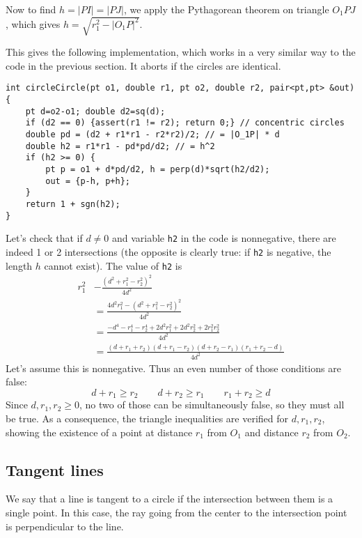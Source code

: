 Now to find $h=|PI|=|PJ|$, we apply the Pythagorean theorem on triangle $O_1PJ$, which gives $h=\sqrt{r_1^2 - |O_1P|^2}$.

This gives the following implementation, which works in a very similar way to the code in the previous section. It aborts if the circles are identical.
\begin{lstlisting}
int circleCircle(pt o1, double r1, pt o2, double r2, pair<pt,pt> &out) {
    pt d=o2-o1; double d2=sq(d);
    if (d2 == 0) {assert(r1 != r2); return 0;} // concentric circles
    double pd = (d2 + r1*r1 - r2*r2)/2; // = |O_1P| * d
    double h2 = r1*r1 - pd*pd/d2; // = h^2
    if (h2 >= 0) {
        pt p = o1 + d*pd/d2, h = perp(d)*sqrt(h2/d2);
        out = {p-h, p+h};
    }
    return 1 + sgn(h2);
}
\end{lstlisting}

\begin{mathy}
Let's check that if $d \neq 0$ and variable \lstinline|h2| in the code is nonnegative, there are indeed 1 or 2 intersections (the opposite is clearly true: if \lstinline|h2| is negative, the length $h$ cannot exist). The value of \lstinline|h2| is
\begin{align*}
r_1^2 &- \frac{(d^2 + r_1^2 - r_2^2)^2}{4d^2}\\
&= \frac{4d^2r_1^2 - (d^2 + r_1^2 - r_2^2)^2}{4d^2}\\
&= \frac{-d^4-r_1^4-r_2^4+2d^2r_1^2+2d^2r_2^2+2r_1^2r_2^2}{4d^2}\\
&= \frac{(d+r_1+r_2)(d+r_1-r_2)(d+r_2-r_1)(r_1+r_2-d)}{4d^2}
\end{align*}
Let's assume this is nonnegative. Thus an even number of those conditions are false:
\[d+r_1 \geq r_2 \qquad d+r_2 \geq r_1 \qquad r_1+r_2 \geq d\]
Since $d,r_1,r_2 \geq 0$, no two of those can be simultaneously false, so they must all be true. As a consequence, the triangle inequalities are verified for $d,r_1,r_2$, showing the existence of a point at distance $r_1$ from $O_1$ and distance $r_2$ from $O_2$.
\end{mathy}

\subsection{Tangent lines}
We say that a line is tangent to a circle if the intersection between them is a single point. In this case, the ray going from the center to the intersection point is perpendicular to the line.


